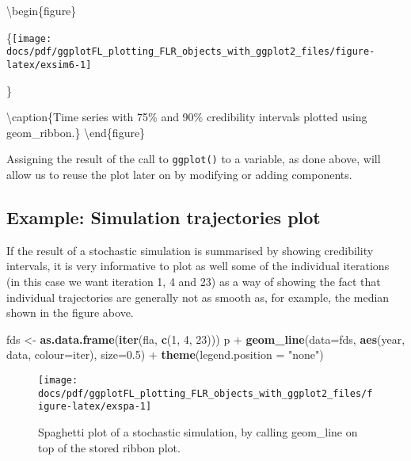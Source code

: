 \documentclass[]{article}
\newenvironment{Shaded}{\begin{snugshade}}{\end{snugshade}}
\newcommand{\KeywordTok}[1]{\textcolor[rgb]{0.13,0.29,0.53}{\textbf{{#1}}}}
\newcommand{\DataTypeTok}[1]{\textcolor[rgb]{0.13,0.29,0.53}{{#1}}}
\newcommand{\DecValTok}[1]{\textcolor[rgb]{0.00,0.00,0.81}{{#1}}}
\newcommand{\FloatTok}[1]{\textcolor[rgb]{0.00,0.00,0.81}{{#1}}}
\newcommand{\StringTok}[1]{\textcolor[rgb]{0.31,0.60,0.02}{{#1}}}
\newcommand{\NormalTok}[1]{{#1}}
\begin{document}
\textbackslash{}begin\{figure\}

\{\centering \texttt{[image: docs/pdf/ggplotFL\_plotting\_FLR\_objects\_with\_ggplot2\_files/figure-latex/exsim6-1]}

\}

\textbackslash{}caption\{Time series with 75\% and 90\% credibility
intervals plotted using geom\_ribbon.\}\label{fig:exsim6}
\textbackslash{}end\{figure\}

Assigning the result of the call to \texttt{ggplot()} to a variable, as
done above, will allow us to reuse the plot later on by modifying or
adding components.

\subsection{Example: Simulation trajectories
plot}\label{example-simulation-trajectories-plot}

If the result of a stochastic simulation is summarised by showing
credibility intervals, it is very informative to plot as well some of
the individual iterations (in this case we want iteration 1, 4 and 23)
as a way of showing the fact that individual trajectories are generally
not as smooth as, for example, the median shown in the figure above.

\begin{Shaded}
\begin{Highlighting}[]
\NormalTok{fds  <-}\StringTok{ }\KeywordTok{as.data.frame}\NormalTok{(}\KeywordTok{iter}\NormalTok{(fla, }\KeywordTok{c}\NormalTok{(}\DecValTok{1}\NormalTok{, }\DecValTok{4}\NormalTok{, }\DecValTok{23}\NormalTok{)))}
\NormalTok{p +}\StringTok{ }\KeywordTok{geom_line}\NormalTok{(}\DataTypeTok{data=}\NormalTok{fds, }\KeywordTok{aes}\NormalTok{(year, data, }\DataTypeTok{colour=}\NormalTok{iter), }\DataTypeTok{size=}\FloatTok{0.5}\NormalTok{) +}\StringTok{ }
\StringTok{  }\KeywordTok{theme}\NormalTok{(}\DataTypeTok{legend.position =} \StringTok{"none"}\NormalTok{)}
\end{Highlighting}
\end{Shaded}

\begin{figure}

{\centering \texttt{[image: docs/pdf/ggplotFL\_plotting\_FLR\_objects\_with\_ggplot2\_files/figure-latex/exspa-1]} 

}

\caption{Spaghetti plot of a stochastic simulation, by calling geom_line on top of the stored ribbon plot.}\label{fig:exspa}
\end{figure}
\end{document}
